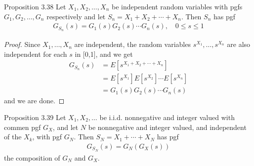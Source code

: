 %
%
\begin{boks}{Proposition 3.38}
  Let $X_1, X_2, \ldots, X_n$ be independent random variables with pgfs $G_1, G_2, \ldots, G_n$ respectively and let $S_n = X_1 + X_2 + \cdots + X_n$. Then $S_n$ has pgf
  \begin{align*}
    G_{S_n}(s) = G_1(s)G_2(s)\cdots G_n(s), \quad 0 \leq s \leq 1
  \end{align*}
\end{boks}

\begin{proof}
  Since $X_1, \ldots, X_n$ are independent, the random variables $s^{X_1}, \ldots, s^{X_n}$ are also independent for each $s$ in [0,1], and we get
  \begin{align*}
    G_{S_n}(s) &= E[s^{X_1 + X_2 + \cdots + X_n}]\\
    &= E[s^{X_1}]E[s^{X_2}] \cdots E[s^{X_n}]\\
    &= G_1(s)G_2(s) \cdots G_n(s)
  \end{align*}
  and we are done.
\end{proof}
%
\begin{boks}{Proposition 3.39}
  Let $X_1, X_2, \ldots$ be i.i.d. nonnegative and integer valued with commen pgf $G_X$, and let $N$ be nonnegative and integer valued, and independent of the $X_k$, with pgf $G_N$. Then $S_N = X_1 + \cdots + X_N$ has pgf
  \begin{align*}
    G_{S_N}(s) = G_N(G_X(s))
  \end{align*}
  the composition of $G_N$ and $G_X$.
\end{boks}

